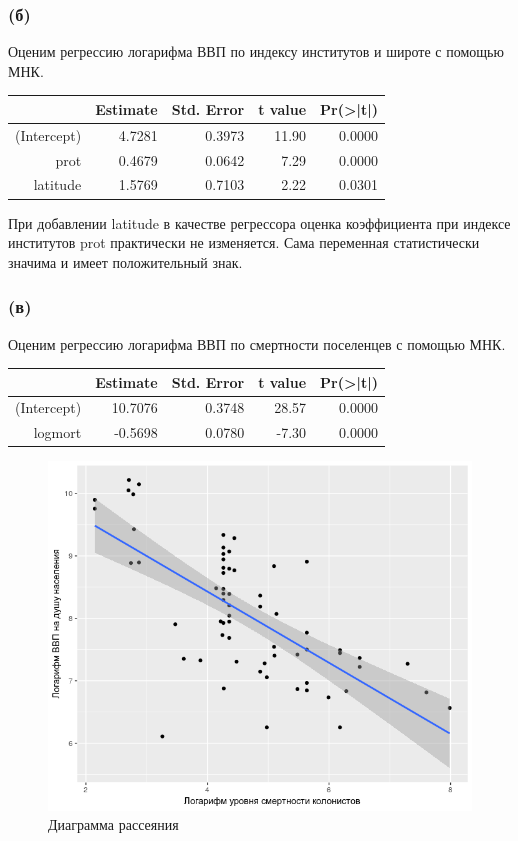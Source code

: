 \documentclass[a4paper,12pt]{article} %
\begin{document}
	
\subsubsection*{(б)}	

Оценим регрессию логарифма ВВП по индексу институтов и широте  с помощью МНК.


\begin{table}[h!]
	\centering
	\begin{tabular}{rrrrr}
		\hline
		& Estimate & Std. Error & t value & Pr(>|t|) \\ 
		\hline
		(Intercept) & 4.7281 & 0.3973 & 11.90 & 0.0000 \\ 
		prot & 0.4679 & 0.0642 & 7.29 & 0.0000 \\ 
		latitude & 1.5769 & 0.7103 & 2.22 & 0.0301 \\ 
		\hline
	\end{tabular}
\end{table}


При добавлении latitude в качестве регрессора  
оценка коэффициента при индексе институтов prot практически не изменяется. Сама переменная статистически значима и имеет положительный знак.



\subsubsection*{(в)}	

Оценим регрессию логарифма ВВП по смертности поселенцев  с помощью МНК.

\begin{table}[h!]
	\centering
	\begin{tabular}{rrrrr}
		\hline
		& Estimate & Std. Error & t value & Pr(>|t|) \\ 
		\hline
		(Intercept) & 10.7076 & 0.3748 & 28.57 & 0.0000 \\ 
		logmort & -0.5698 & 0.0780 & -7.30 & 0.0000 \\ 
		\hline
	\end{tabular}
\end{table}

\begin{figure}[h!]
	\centering
	\includegraphics[width=0.7\linewidth]{Rplot2}
	\caption[Диаграмма рассеяния]{Диаграмма рассеяния}
	\label{fig:rplot1}
\end{figure}
\end{document}
